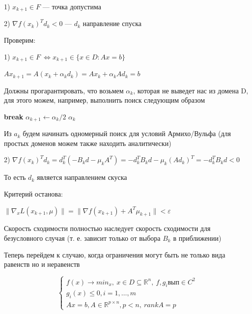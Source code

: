 1) $x_{k+1} \in F$ —  точка допустима

2) $\nabla f(x_k)^T d_k < 0$ —   $d_k$ направление спуска

\bigskip

Проверим:

1) $x_{k+1} \in F \  \Leftrightarrow x_{k+1} \in \{x \in D: Ax = b \}$

$Ax_{k+1} = A(x_k + \alpha_k d_k) = Ax_k + \alpha_k Ad_k = b$

Должны прогарантировать, что возьмем $\alpha_k$, которая не выведет нас из домена D, для этого можем, например, выполнить поиск следующим образом

 \begin{algorithm}[H]
	\begin{algorithmic}[1]
		 \textbf{break}
		\EndIf
		\State $\alpha_{k+1} \gets \alpha_k / 2 $
		\EndFor
		\State \Return $\alpha_k$
		\EndProcedure
	\end{algorithmic}
\end{algorithm}


Из $a_k$ будем начинать одномерный поиск для условий Армихо/Вульфа (для простых доменов можем также находить аналитически)

\bigskip

2) $\nabla f(x_k)^Td_k = d_k^T(-B_kd - \mu_k A^T) = -d_k^T B_k d - \mu_k (Ad_k)^T = -d_k^T B_k d  < 0$

То есть $d_k$ является направлением скуска

\bigskip

Критерий останова:

$\|\nabla_x L(x_{k+1}, \mu)\| = \|\nabla f(x_{k+1}) + A^T\mu_{k+1} \| < \varepsilon$

Скорость сходимости полностью наследует скорость сходимости для безусловного случая (т. е. зависит только от выбора $B_k$ в приближении)

\bigskip

Теперь перейдем к случаю, когда ограничения могут быть не только вида равенств но и неравенств


\[
\begin{cases}
f(x) \to min_x, \ x \in D \subseteq \mathbb{R}^n, \ f, g_i \text{вып} \in C^{2} \\
g_i(x) \leqslant 0, i = 1,  \dots, m\\
Ax = b, A \in \mathbb{R}^{p \times n}, p < n, \ rank A = p
\end{cases}
\]

